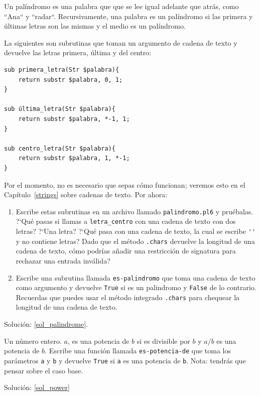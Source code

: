 \begin{exercise}
\label{palindrome}

Un palíndromo es una palabra que que se lee igual adelante que atrás,
como ``Ana`` y ``radar``. Recursivamente, una palabra es un palíndromo
si las primera y últimas letras son las mismas y el medio es un palíndromo.

La siguientes son subrutinas que toman un argumento de cadena de texto
y devuelve las letras primera, última y del centro:

\begin{lstlisting}
sub primera_letra(Str $palabra){
    return substr $palabra, 0, 1;
}

sub última_letra(Str $palabra){
    return substr $palabra, *-1, 1;
}

sub centro_letra(Str $palabra){
    return substr $palabra, 1, *-1;
}
\end{lstlisting}
%
Por el momento, no es necesario que sepas cómo funcionan; veremos esto en el 
Capítulo~\ref{strings} sobre cadenas de texto. Por ahora:

\begin{enumerate}

\item Escribe estas subrutinas en un archivo llamado 
{\tt palindromo.pl6} y pruébalas. ?`Qué pasas si llamas 
a \verb|letra_centro| con una cadena de texto con dos letras?
?`Una letra? ?`Qué pasa con una cadena de texto, la cual se escribe
\verb|''| y no contiene letras? Dado que el método {\tt .chars}
devuelve la longitud de una cadena de texto, cómo podrías añadir
una restricción de signatura para rechazar una entrada inválida?

\item Escribe una subrutina llamada \verb|es-palindromo| que toma
una cadena de texto como argumento y devuelve {\tt True} si es 
un palindromo y {\tt False} de lo contrario. Recuerdas que puedes
usar el método integrado {\tt .chars} para chequear la longitud 
de una cadena de texto.

\end{enumerate}

Solución: \ref{sol_palindrome}.

\end{exercise}

\begin{exercise}
\label{power}

Un número entero. $a$, es una potencia de $b$ si es divisible 
por $b$ y $a/b$ es una potencia de $b$. Escribe una función llamada
\verb|es-potencia-de| que toma los parámetros {\tt a} y {\tt b}
y devuelve {\tt True} si {\tt a} es una potencia de {\tt b}.
Nota: tendrás que pensar sobre el caso base.

Solución: \ref{sol_power}

\end{exercise}



